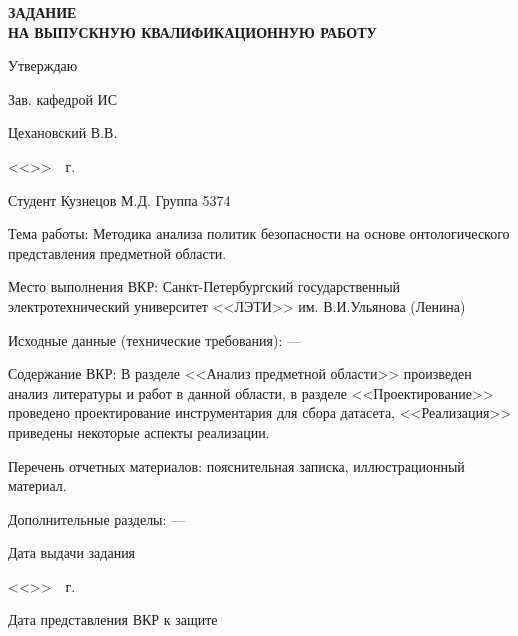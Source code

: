 \documentclass[../main]{subfiles}
\begin{document}
\newpage

\begin{titlepage}
    \centering
        
    \MakeUppercase{\bfseries\large
        задание\\
        на выпускную квалификационную работу
    }

    \vspace{1cm}

    \hfill Утверждаю

    \hfill Зав. кафедрой ИС

    \hfill {} Цехановский В.В.

    \hfill <<\underline{\hspace{1cm}}>>\underline{\hspace{5cm}}~\the\year~г.

    \vspace{1cm}

    \parbox[t]{\textwidth}{
        Студент Кузнецов М.Д. \hfill Группа 5374

        Тема работы: Методика анализа политик безопасности на основе онтологического представления предметной области.

        Место выполнения ВКР: Санкт-Петербургский государственный электротехнический университет 
        <<ЛЭТИ>> им. В.И.Ульянова (Ленина)
        
        Исходные данные (технические требования): ---

        Содержание ВКР: В разделе <<Анализ предметной области>> произведен анализ литературы и работ в данной области, в разделе <<Проектирование>> проведено проектирование инструментария для сбора датасета, <<Реализация>> приведены некоторые аспекты реализации.

        Перечень отчетных материалов: пояснительная записка, иллюстрационный материал.

        Дополнительные разделы: ---
    }

    \vfill

    \begin{minipage}[t]{6cm}
        Дата выдачи задания

        <<\underline{\hspace{1cm}}>>\underline{\hspace{3cm}}~\the\year~г.
    \end{minipage}
    \hfill
    \begin{minipage}[t]{8cm}
        Дата представления ВКР к защите


\end{minipage}
\end{titlepage}
\end{document}
